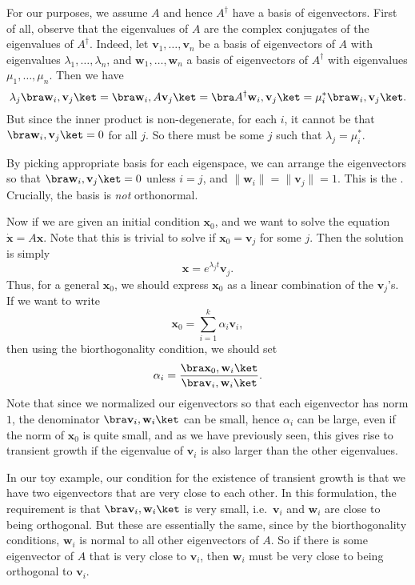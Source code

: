 \documentclass[a4paper]{article}
\begin{document}
For our purposes, we assume $A$ and hence $A^\dagger$ have a basis of eigenvectors. First of all, observe that the eigenvalues of $A$ are the complex conjugates of the eigenvalues of $A^\dagger$. Indeed, let $\mathbf{v}_1, \ldots, \mathbf{v}_n$ be a basis of eigenvectors of $A$ with eigenvalues $\lambda_1, \ldots, \lambda_n$, and $\mathbf{w}_1, \ldots, \mathbf{w}_n$ a basis of eigenvectors of $A^\dagger$ with eigenvalues $\mu_1, \ldots, \mu_n$. Then we have
\[
  \lambda_j \bra \mathbf{w}_i, \mathbf{v}_j\ket = \bra \mathbf{w}_i, A \mathbf{v}_j\ket = \bra A^\dagger \mathbf{w}_i, \mathbf{v}_j\ket = \mu_i^* \bra \mathbf{w}_i, \mathbf{v}_j\ket.
\]
But since the inner product is non-degenerate, for each $i$, it cannot be that $\bra \mathbf{w}_i, \mathbf{v}_j\ket = 0$ for all $j$. So there must be some $j$ such that $\lambda_j = \mu_i^*$.

By picking appropriate basis for each eigenspace, we can arrange the eigenvectors so that $\bra \mathbf{w}_i, \mathbf{v}_j\ket = 0$ unless $i = j$, and $\|\mathbf{w}_i\| = \|\mathbf{v}_j\| = 1$. This is the . Crucially, the basis is \emph{not} orthonormal.

Now if we are given an initial condition $\mathbf{x}_0$, and we want to solve the equation $\dot{\mathbf{x}} = A\mathbf{x}$. Note that this is trivial to solve if $\mathbf{x}_0 = \mathbf{v}_j$ for some $j$. Then the solution is simply
\[
  \mathbf{x} = e^{\lambda_j t} \mathbf{v}_j.
\]
Thus, for a general $\mathbf{x}_0$, we should express $\mathbf{x}_0$ as a linear combination of the $\mathbf{v}_j$'s. If we want to write
\[
  \mathbf{x}_0 = \sum_{i = 1}^k \alpha_i \mathbf{v}_i,
\]
then using the biorthogonality condition, we should set
\[
  \alpha_i = \frac{\bra \mathbf{x}_0, \mathbf{w}_i\ket}{\bra \mathbf{v}_i, \mathbf{w}_i\ket}.
\]
Note that since we normalized our eigenvectors so that each eigenvector has norm $1$, the denominator $\bra \mathbf{v}_i, \mathbf{w}_i\ket$ can be small, hence $\alpha_i$ can be large, even if the norm of $\mathbf{x}_0$ is quite small, and as we have previously seen, this gives rise to transient growth if the eigenvalue of $\mathbf{v}_i$ is also larger than the other eigenvalues.

In our toy example, our condition for the existence of transient growth is that we have two eigenvectors that are very close to each other. In this formulation, the requirement is that $\bra \mathbf{v}_i, \mathbf{w}_i\ket$ is very small, i.e.\ $\mathbf{v}_i$ and $\mathbf{w}_i$ are close to being orthogonal. But these are essentially the same, since by the biorthogonality conditions, $\mathbf{w}_i$ is normal to all other eigenvectors of $A$. So if there is some eigenvector of $A$ that is very close to $\mathbf{v}_i$, then $\mathbf{w}_i$ must be very close to being orthogonal to $\mathbf{v}_i$.
\end{document}
